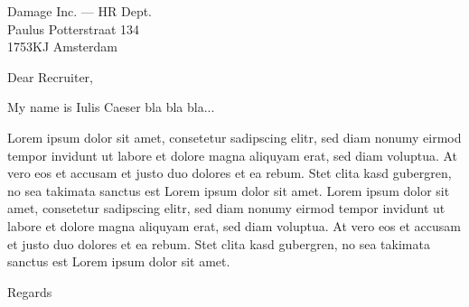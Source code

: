\documentclass[alternate]{scrlttr2}
\begin{document}
\begin{letter}{%
   Damage Inc. --- HR Dept.\\%
   Paulus Potterstraat 134\\%
   1753KJ Amsterdam
}

\opening{Dear Recruiter,}

My name is Iulis Caeser bla bla bla...

Lorem ipsum dolor sit amet, consetetur sadipscing elitr, sed diam nonumy eirmod tempor invidunt ut labore et dolore magna aliquyam erat, sed diam voluptua. At vero eos et accusam et justo duo dolores et ea rebum. Stet clita kasd gubergren, no sea takimata sanctus est Lorem ipsum dolor sit amet. Lorem ipsum dolor sit amet, consetetur sadipscing elitr, sed diam nonumy eirmod tempor invidunt ut labore et dolore magna aliquyam erat, sed diam voluptua. At vero eos et accusam et justo duo dolores et ea rebum. Stet clita kasd gubergren, no sea takimata sanctus est Lorem ipsum dolor sit amet.

\closing{Regards}


\end{letter}
\end{document}

